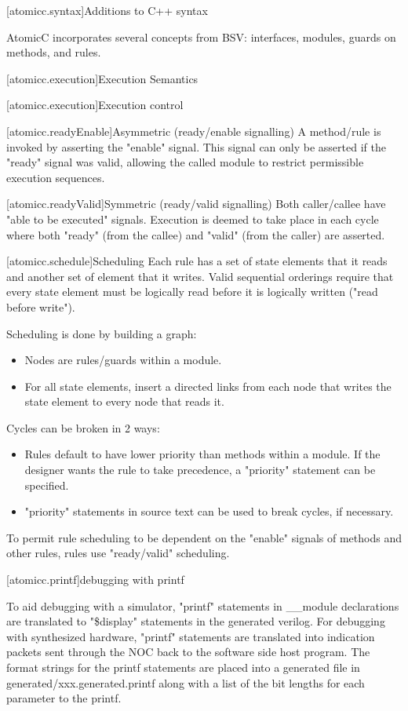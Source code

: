 [atomicc.syntax]{Additions to C++ syntax}

AtomicC incorporates several concepts from BSV: interfaces, modules, guards on methods, and rules.

[atomicc.execution]{Execution Semantics}

[atomicc.execution]{Execution control}

[atomicc.readyEnable]{Asymmetric (ready/enable signalling)}
A method/rule is invoked by asserting the "enable" signal.  This signal can only be
asserted if the "ready" signal was valid, allowing the called module to restrict
permissible execution sequences.

[atomicc.readyValid]{Symmetric (ready/valid signalling)}
Both caller/callee have "able to be executed" signals.  Execution is deemed to take
place in each cycle where both "ready" (from the callee) and "valid" (from the caller)
are asserted.

[atomicc.schedule]{Scheduling}
Each rule has a set of state elements that it reads and another set of element that it writes.
Valid sequential orderings require that every state element must be logically read before it is logically
written ("read before write").

Scheduling is done by building a graph:
\begin{itemize}
\item Nodes are rules/guards within a module.
\item For all state elements, insert a directed links from each node that writes the state element to every node that reads it.
\end{itemize}

Cycles can be broken in 2 ways:
\begin{itemize}
\item Rules default to have lower priority than methods within a module.  If the designer wants the rule to take precedence, a "priority" statement can be specified.
\item "priority" statements in source text can be used to break cycles, if necessary.
\end{itemize}

To permit rule scheduling to be dependent on the "enable" signals of methods and other rules, rules use "ready/valid" scheduling.

[atomicc.printf]{debugging with printf}

To aid debugging with a simulator, "printf" statements in __module declarations are
translated to "\$display" statements in the generated verilog.
For debugging with synthesized hardware, "printf" statements are translated into
indication packets sent through the NOC back to the software side host program.
The format strings for the printf statements are placed into a generated file
in generated/xxx.generated.printf along with a list of the bit lengths for each
parameter to the printf.


